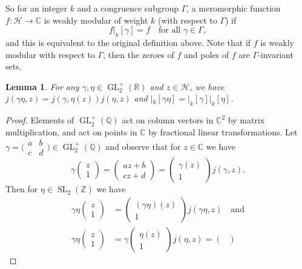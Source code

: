 \documentclass[10pt,leqno,twoside]{article}
\theoremstyle{plain}
\newtheorem{lemma}[lem]{Lemma}
\theoremstyle{definition}
\numberwithin{equation}{section}
\numberwithin{lem}{section}
\DeclareMathOperator{\GL}{GL}
\DeclareMathOperator{\SL}{SL}
\newcommand{\smallabcd}{\big(\!\begin{smallmatrix}
    a & b \\ c & d
\end{smallmatrix}\!\big)}
\newcommand{\slz}{\SL_2(\mathbb{Z})}
\newcommand{\glrp}{\GL_2^+(\mathbb{R})}
\newcommand{\glqp}{\GL_2^+(\mathbb{Q})}
\begin{document}
So for an integer $k$ and a congruence subgroup $\varGamma$, a meromorphic function $f\colon \mathcal H \to \mathbb{C}$ is weakly modular of weight $k$ (with respect to $\varGamma$) if \[f|_k[\gamma] = f\quad\text{for all }\gamma\in \varGamma,\] and this is equivalent to the original definition above. Note that if $f$ is weakly modular with respect to $\varGamma$, then the zeroes of $f$ and poles of $f$ are $\varGamma$-invariant sets.

\begin{lemma}\label{lem: props of automorphy}
    For any $\gamma,\eta\in \glrp$ and $z\in \mathcal H$, we have $j(\gamma\eta,z) = j(\gamma,\eta(z))j(\eta,z)$ and $|_k[\gamma\eta] = |_k[\gamma]|_k[\eta]$.
\end{lemma}
\begin{proof}
    Elements of $\glqp$ act on column vectors in $\mathbb C^2$ by matrix multiplication, and act on points in $\mathbb C$ by fractional linear transformations. Let $\gamma = \smallabcd\in \glqp$ and observe that for $z\in\mathbb C$ we have \[\gamma\begin{pmatrix}
        z \\ 1
    \end{pmatrix} = \begin{pmatrix}
        az+b \\ cz+d
    \end{pmatrix} = \begin{pmatrix}
        \gamma(z) \\ 1
    \end{pmatrix}j(\gamma,z).\]
    Then for $\eta\in\slz$ we have
    \begin{align*}
        \gamma\eta\begin{pmatrix}
            z \\ 1
        \end{pmatrix} &= \begin{pmatrix}
            (\gamma\eta)(z) \\ 1
        \end{pmatrix}j(\gamma\eta,z)\quad\text{and}\\
        \gamma\eta\begin{pmatrix}
            z \\ 1
        \end{pmatrix} &= \gamma\begin{pmatrix}
            \eta(z) \\ 1
        \end{pmatrix}j(\eta,z) = \begin{pmatrix}

\end{pmatrix}
\end{align*}
\end{proof}
\end{document}
